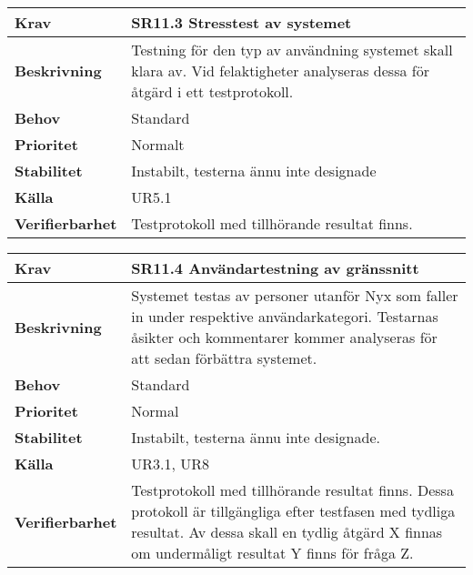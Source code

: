 \documentclass[a4paper, twoside, 11pt, titlepage]{article}
\begin{document}
\begin{tabular} { p{2.6cm} p{12.5cm} }
	\hline
	\sffamily\textbf{Krav} & \sffamily\textbf{SR11.3 Stresstest av systemet } \\
	\hline
	\sffamily\textbf{Beskrivning} & Testning för den typ av användning systemet skall klara av. Vid felaktigheter analyseras dessa för åtgärd i ett testprotokoll.   \\
	\hline
	\sffamily\textbf{Behov} & Standard  \\
	\hline
	\sffamily\textbf{Prioritet} &  Normalt  \\
	\hline
	\sffamily\textbf{Stabilitet} &  Instabilt, testerna ännu inte designade  \\
	\hline
	\sffamily\textbf{Källa} &  UR5.1   \\
	\hline
	\sffamily\textbf{Verifierbarhet} &  Testprotokoll med tillhörande resultat finns.   \\
	\hline
\end{tabular}
\vspace{6mm}

\begin{tabular} { p{2.6cm} p{12.5cm} }
	\hline
	\sffamily\textbf{Krav} & \sffamily\textbf{SR11.4 Användartestning av gränssnitt  } \\
	\hline
	\sffamily\textbf{Beskrivning} & Systemet testas av personer utanför Nyx som faller in under respektive användarkategori. Testarnas åsikter och kommentarer kommer analyseras för att sedan förbättra systemet.   \\
	\hline
	\sffamily\textbf{Behov} &  Standard   \\
	\hline
	\sffamily\textbf{Prioritet} &  Normal  \\
	\hline
	\sffamily\textbf{Stabilitet} &  Instabilt, testerna ännu inte designade.   \\
	\hline
	\sffamily\textbf{Källa} &  UR3.1, UR8  \\
	\hline
	\sffamily\textbf{Verifierbarhet} &  Testprotokoll med tillhörande resultat finns. Dessa protokoll är tillgängliga efter testfasen med tydliga resultat. Av dessa skall en tydlig åtgärd X finnas om undermåligt resultat Y finns för fråga Z.   \\
	\hline
\end{tabular}
\vspace{6mm}
\end{document}

